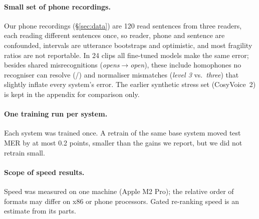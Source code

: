 \paragraph{Small set of phone recordings.} Our phone recordings (\S\ref{sec:data}) are 120 read sentences from three readers, each reading different sentences once, so reader, phone and sentence are confounded, intervals are utterance bootstraps and optimistic, and most fragility ratios are not reportable. In 24 clips all fine-tuned models make the same error; besides shared misrecognitions (\emph{opens}$\rightarrow$\emph{open}), these include homophones no recogniser can resolve (/) and normaliser mismatches (\emph{level 3} vs.\ \emph{three}) that slightly inflate every system's error. The earlier synthetic stress set (CosyVoice~2) is kept in the appendix for comparison only.

\paragraph{One training run per system.} Each system was trained once. A retrain of the same base system moved test MER by at most 0.2 points, smaller than the gains we report, but we did not retrain small.

\paragraph{Scope of speed results.} Speed was measured on one machine (Apple M2 Pro); the relative order of formats may differ on x86 or phone processors. Gated re-ranking speed is an estimate from its parts.

